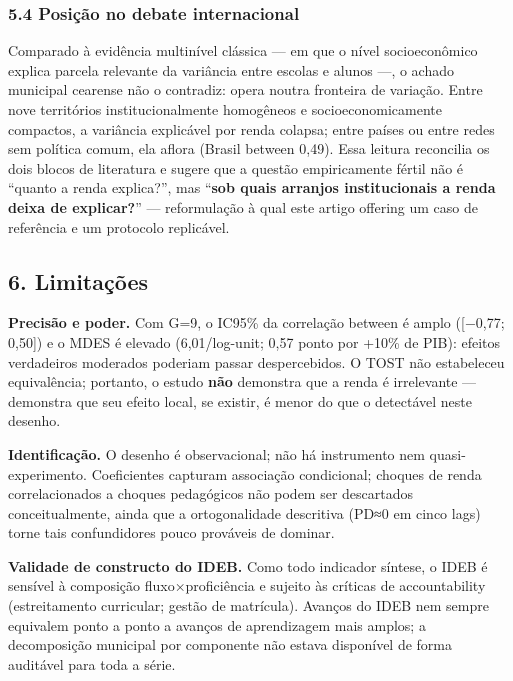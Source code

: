 \documentclass[
  brazilian,
  12pt,
  a4paper,
]{article}
\begin{document}
\subsubsection{5.4 Posição no debate
internacional}\label{posiuxe7uxe3o-no-debate-internacional}

Comparado à evidência multinível clássica --- em que o nível
socioeconômico explica parcela relevante da variância entre escolas e
alunos ---, o achado municipal cearense não o contradiz: opera noutra
fronteira de variação. Entre nove territórios institucionalmente
homogêneos e socioeconomicamente compactos, a variância explicável por
renda colapsa; entre países ou entre redes sem política comum, ela
aflora (Brasil between 0,49). Essa leitura reconcilia os dois blocos de
literatura e sugere que a questão empiricamente fértil não é ``quanto a
renda explica?'', mas ``\textbf{sob quais arranjos institucionais a
renda deixa de explicar?}'' --- reformulação à qual este artigo offering
um caso de referência e um protocolo replicável.

\subsection{6. Limitações}\label{limitauxe7uxf5es}

\textbf{Precisão e poder.} Com G=9, o IC95\% da correlação between é
amplo ({[}−0,77; 0,50{]}) e o MDES é elevado (6,01/log-unit; 0,57 ponto
por +10\% de PIB): efeitos verdadeiros moderados poderiam passar
despercebidos. O TOST não estabeleceu equivalência; portanto, o estudo
\textbf{não} demonstra que a renda é irrelevante --- demonstra que seu
efeito local, se existir, é menor do que o detectável neste desenho.

\textbf{Identificação.} O desenho é observacional; não há instrumento
nem quasi-experimento. Coeficientes capturam associação condicional;
choques de renda correlacionados a choques pedagógicos não podem ser
descartados conceitualmente, ainda que a ortogonalidade descritiva (PD≈0
em cinco lags) torne tais confundidores pouco prováveis de dominar.

\textbf{Validade de constructo do IDEB.} Como todo indicador síntese, o
IDEB é sensível à composição fluxo×proficiência e sujeito às críticas de
accountability (estreitamento curricular; gestão de matrícula). Avanços
do IDEB nem sempre equivalem ponto a ponto a avanços de aprendizagem
mais amplos; a decomposição municipal por componente não estava
disponível de forma auditável para toda a série.
\end{document}
